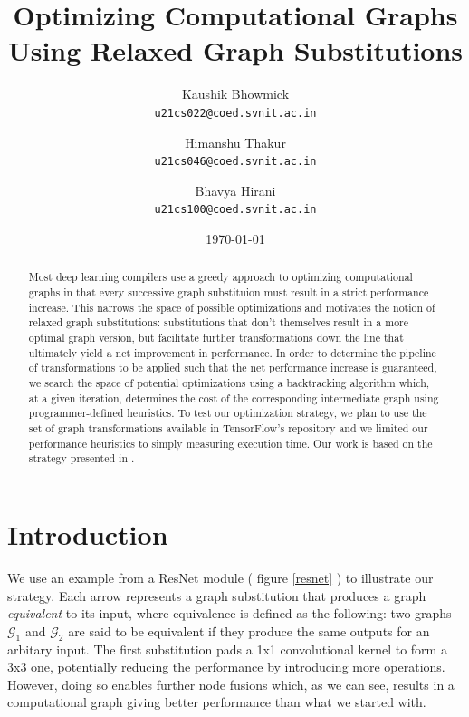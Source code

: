 \documentclass[10pt a4paper twoside]{report}
\title{Optimizing Computational Graphs Using Relaxed Graph Substitutions}
\author{Kaushik Bhowmick\\ \texttt{u21cs022@coed.svnit.ac.in}
		\and
		Himanshu Thakur\\ \texttt{u21cs046@coed.svnit.ac.in}
		\and
		Bhavya Hirani\\ \texttt{u21cs100@coed.svnit.ac.in}
		}
\date{\today}
\begin{document}
\maketitle


\begin{abstract}

	Most deep learning compilers use a greedy approach to optimizing computational graphs in that every successive graph substituion must result in a strict performance increase. This narrows the space of possible optimizations and motivates the notion of relaxed graph substitutions: substitutions that don't themselves result in a more optimal graph version, but facilitate further transformations down the line that ultimately yield a net improvement in performance. In order to determine the pipeline of transformations to be applied such that the net performance increase is guaranteed, we search the space of potential optimizations using a backtracking algorithm which, at a given iteration, determines the cost of the corresponding intermediate graph using programmer-defined heuristics. To test our optimization strategy, we plan to use the set of graph transformations available in TensorFlow's repository and we limited our performance heuristics to simply measuring execution time. Our work is based on the strategy presented in \cite{jia2019}.\\

\end{abstract}

\chapter{Introduction}

We use an example from a ResNet \cite{he2016} module ( figure \ref{resnet} ) to illustrate our strategy. Each arrow represents a graph substitution that produces a graph \textit{equivalent} to its input, where equivalence is defined as the following: two graphs $\mathcal{G}_1$ and $\mathcal{G}_2$ are said to be equivalent if they produce the same outputs for an arbitary input. The first substitution pads a 1x1 convolutional kernel to form a 3x3 one, potentially reducing the performance by introducing more operations. However, doing so enables further node fusions which, as we can see, results in a computational graph giving better performance than what we started with. \\
\end{document}
